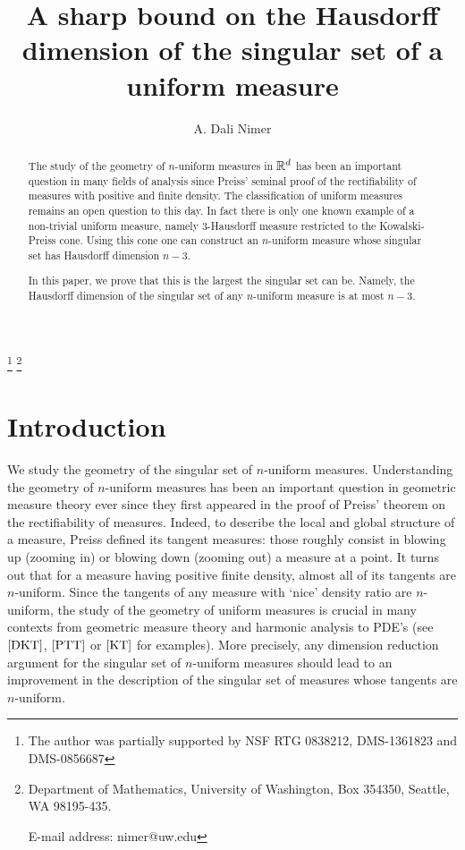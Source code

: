 \documentclass[11pt]{article}
\theoremstyle{definition}
\theoremstyle{remark}
\numberwithin{equation}{section}
\begin{document}
\title{A sharp bound on the Hausdorff dimension of the singular set of a uniform measure}
\author{ A. Dali Nimer}
\date{}
\maketitle\footnote{The author was partially supported by NSF RTG 0838212, DMS-1361823 and DMS-0856687}
\footnote{Department of Mathematics, University of Washington, Box 354350, Seattle, WA
98195-435.

E-mail address: nimer@uw.edu}


\begin{abstract}
The study of the geometry of $n$-uniform measures in $\mathbb{R}^{d}$ has been an important question in many fields of analysis since Preiss' seminal proof of the rectifiability of measures with positive and finite density.
The classification of uniform measures remains an open question to this day. In fact there is only one known example of a non-trivial uniform measure, namely $3$-Hausdorff measure restricted to the Kowalski-Preiss cone.
Using this cone one can construct an $n$-uniform measure whose singular set has Hausdorff dimension $n-3$. 
 
 In this paper, we prove that this is the largest the singular set can be. Namely, the Hausdorff dimension of the singular set of any $n$-uniform measure is at most $n-3$.
\end{abstract}

\section{Introduction}

We study the geometry of the singular set of $n$-uniform measures. Understanding the geometry of $n$-uniform measures has been an important question in geometric measure theory ever since they first appeared in the proof of Preiss' theorem on the rectifiability of measures. 
Indeed, to describe the local and global structure of a measure, Preiss defined its tangent measures:  those roughly consist in blowing up (zooming in) or blowing down (zooming out) a measure at a point. It turns out that for a measure having positive finite density, almost all of its tangents are $n$-uniform.
 Since the tangents of any measure with `nice' density ratio are $n$-uniform, the study of the geometry of uniform measures is crucial in many contexts from geometric measure theory and harmonic analysis to PDE's (see $\cite{DKT}$, $\cite{PTT}$ or $\cite{KT}$ for examples). More precisely, any dimension reduction argument for the singular set of $n$-uniform measures should lead to an improvement in the description of the singular set of measures whose tangents are $n$-uniform.
 
\end{document}
